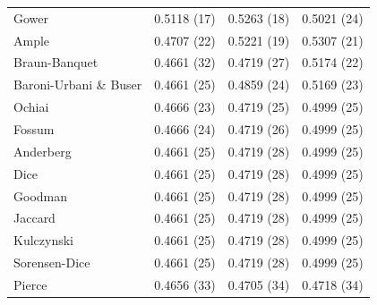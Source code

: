 \begin{table}[t]
{\begin{tabular}{lccc}
Gower & 0.5118 (17) & 0.5263 (18) & 0.5021 (24) \\
Ample & 0.4707 (22) & 0.5221 (19) & 0.5307 (21) \\
Braun-Banquet & 0.4661 (32) & 0.4719 (27) & 0.5174 (22) \\
Baroni-Urbani \& Buser & 0.4661 (25) & 0.4859 (24) & 0.5169 (23) \\
Ochiai & 0.4666 (23) & 0.4719 (25) & 0.4999 (25) \\
Fossum & 0.4666 (24) & 0.4719 (26) & 0.4999 (25) \\
Anderberg & 0.4661 (25) & 0.4719 (28) & 0.4999 (25) \\
Dice & 0.4661 (25) & 0.4719 (28) & 0.4999 (25) \\
Goodman & 0.4661 (25) & 0.4719 (28) & 0.4999 (25) \\
Jaccard & 0.4661 (25) & 0.4719 (28) & 0.4999 (25) \\
Kulczynski & 0.4661 (25) & 0.4719 (28) & 0.4999 (25) \\
Sorensen-Dice & 0.4661 (25) & 0.4719 (28) & 0.4999 (25) \\
Pierce & 0.4656 (33) & 0.4705 (34) & 0.4718 (34) \\
\bottomrule
\end{tabular}
}
\end{table}
